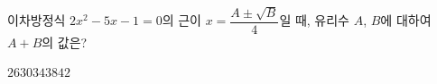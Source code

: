 이차방정식 $2x^2-5x-1=0$의 근이 $x=\dfrac{A\pm\sqrt{B}}{4}$일 때, 유리수 $A$, $B$에 대하여 $A+B$의 값은?
\begin{choices32}{$26$}{$30$}{$34$}{$38$}{$42$}\end{choices32}
